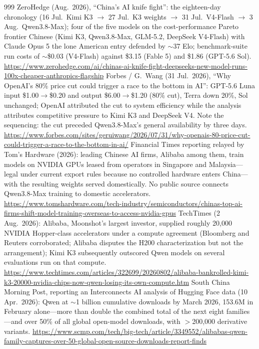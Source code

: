 \begin{thebibliography}{999}
 ZeroHedge (Aug.\ 2026), ``China's AI knife fight'': the eighteen-day chronology (16 Jul.\ Kimi K3 $\to$ 27 Jul.\ K3 weights $\to$ 31 Jul.\ V4-Flash $\to$ 3 Aug.\ Qwen3.8-Max); four of the five models on the cost-performance Pareto frontier Chinese (Kimi K3, Qwen3.8-Max, GLM-5.2, DeepSeek V4-Flash) with Claude Opus 5 the lone American entry defended by $\sim$37 Elo; benchmark-suite run costs of $\sim$\$0.03 (V4-Flash) against \$3.15 (Fable 5) and \$1.86 (GPT-5.6 Sol). \url{https://www.zerohedge.com/ai/chinas-ai-knife-fight-deepseeks-new-model-runs-100x-cheaper-anthropics-flagship}
 Forbes / G.~Wang (31 Jul.\ 2026), ``Why OpenAI's 80\% price cut could trigger a race to the bottom in AI'': GPT-5.6 Luna input \$1.00$\to$\$0.20 and output \$6.00$\to$\$1.20 (80\% cut), Terra down 20\%, Sol unchanged; OpenAI attributed the cut to system efficiency while the analysis attributes competitive pressure to Kimi K3 and DeepSeek V4. Note the sequencing: the cut preceded Qwen3.8-Max's general availability by three days. \url{https://www.forbes.com/sites/geruiwang/2026/07/31/why-openais-80-price-cut-could-trigger-a-race-to-the-bottom-in-ai/}
 Financial Times reporting relayed by Tom's Hardware (2026): leading Chinese AI firms, Alibaba among them, train models on NVIDIA GPUs leased from operators in Singapore and Malaysia---legal under current export rules because no controlled hardware enters China---with the resulting weights served domestically. No public source connects Qwen3.8-Max training to domestic accelerators. \url{https://www.tomshardware.com/tech-industry/semiconductors/chinas-top-ai-firms-shift-model-training-overseas-to-access-nvidia-gpus}
 TechTimes (2 Aug.\ 2026): Alibaba, Moonshot's largest investor, supplied roughly 20,000 NVIDIA Hopper-class accelerators under a compute agreement (Bloomberg and Reuters corroborated; Alibaba disputes the H200 characterization but not the arrangement); Kimi K3 subsequently outscored Qwen models on several evaluations run on that compute. \url{https://www.techtimes.com/articles/322699/20260802/alibaba-bankrolled-kimi-k3-20000-nvidia-chips-now-qwen-losing-its-own-compute.htm}
 South China Morning Post, reporting an Interconnects AI analysis of Hugging Face data (10 Apr.\ 2026): Qwen at $\sim$1 billion cumulative downloads by March 2026, 153.6M in February alone---more than double the combined total of the next eight families---and over 50\% of all global open-model downloads, with $>$200,000 derivative variants. \url{https://www.scmp.com/tech/big-tech/article/3349552/alibabas-qwen-family-captures-over-50-global-open-source-downloads-report-finds}

\end{thebibliography}
